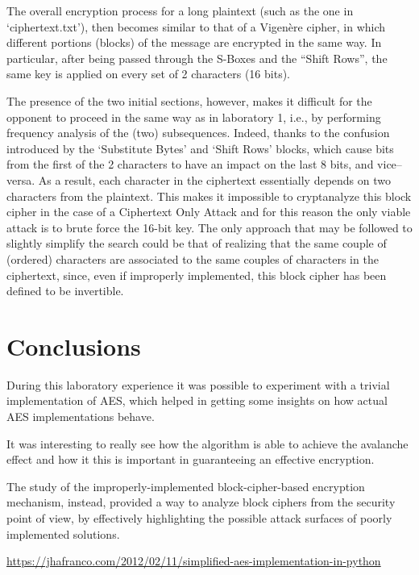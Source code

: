 \documentclass[12pt]{article}
\begin{document}
The overall encryption process for a long plaintext (such as the one in `ciphertext.txt'), then becomes similar to that of a Vigenère cipher, in which different portions (blocks) of the message are encrypted in the same way. In particular, after being passed through the S-Boxes and the ``Shift Rows'', the same key is applied on every set of 2 characters (16 bits).

The presence of the two initial sections, however, makes it difficult for the opponent to proceed in the same way as in laboratory 1, i.e., by performing frequency analysis of the (two) subsequences. Indeed, thanks to the confusion introduced by the `Substitute Bytes' and `Shift Rows' blocks, which cause bits from the first of the 2 characters to have an impact on the last 8 bits, and vice–versa.
As a result, each character in the ciphertext essentially depends on two characters from the plaintext.
This makes it impossible to cryptanalyze this block cipher in the case of a Ciphertext Only Attack and for this reason the only viable attack is to brute force the 16-bit key.
The only approach that may be followed to slightly simplify the search could be that of realizing that the same couple of (ordered) characters are associated to the same couples of characters in the ciphertext, since, even if improperly implemented, this block cipher has been defined to be invertible.


\section{Conclusions}
\label{sec:04}

During this laboratory experience it was possible to experiment with a trivial implementation of AES, which helped in getting some insights on how actual AES implementations behave.

It was interesting to really see how the algorithm is able to achieve the avalanche effect and how it this is important in guaranteeing an effective encryption.

The study of the improperly-implemented block-cipher-based encryption mechanism, instead, provided a way to analyze block ciphers from the security point of view, by effectively highlighting the possible attack surfaces of poorly implemented solutions.

\begin{thebibliography}{5}
    \url{https://jhafranco.com/2012/02/11/simplified-aes-implementation-in-python}
\end{thebibliography}
\end{document}
